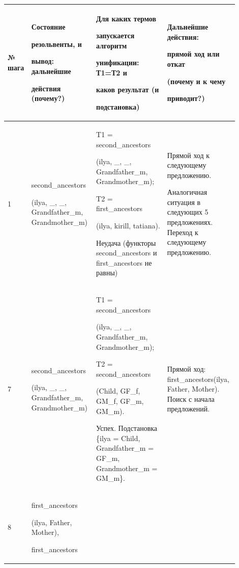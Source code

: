 \documentclass[a4paper,12pt]{article}
\begin{document}
	\begin{center}
		\begin{longtable}[h!]{|p{0.05\linewidth}|p{0.25\linewidth}|p{ 0.3\linewidth}|p{ 0.3\linewidth}|}
			\hline
			{№ шага} & {Состояние 
				
				резольвенты, и 
				
				вывод: дальнейшие 
				
				действия (почему?)} & {Для каких термов 
				
				запускается алгоритм 
				
				унификации: Т1=Т2 и 
				
				каков {\bf результат} (и 
				
				подстановка)} & {Дальнейшие действия: 
				
				прямой ход или откат 
				
				(почему и к чему 
				
				приводит?)}\\
			\hline
			{1} & {second\_ancestors
				
				(ilya, \_, \_, Grandfather\_m, Grandmother\_m)} & {T1 = second\_ancestors
				
				(ilya, \_, \_, Grandfather\_m, Grandmother\_m);
				
				T2 = first\_ancestors
				
				(ilya, kirill, tatiana).
				
				Неудача (функторы second\_ancestors и first\_ancestors не равны)} & {Прямой ход к следующему предложению.
				
				Аналогичная ситуация в следующих 5 предложениях. Переход к следующему предложению.}\\
			\hline
			{7} & {second\_ancestors
				
				(ilya, \_, \_, Grandfather\_m, Grandmother\_m)} & {T1 = second\_ancestors
				
				(ilya, \_, \_, Grandfather\_m, Grandmother\_m);
				
				T2 = second\_ancestors
				
				(Child, GF\_f, GM\_f, GF\_m, GM\_m).
				
				Успех. Подстановка \{ilya = Child, Grandfather\_m = GF\_m, Grandmother\_m = GM\_m\}.} & {Прямой ход: first\_ancestors(ilya, Father, Mother). Поиск с начала предложений.}\\
			\hline
			{8} & {first\_ancestors
				
				(ilya, Father, Mother),
				
				first\_ancestors
				
}
\end{longtable}
\end{center}
\end{document}
